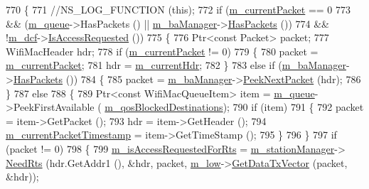 \begin{DoxyCode}
770 \{
771   \textcolor{comment}{//NS\_LOG\_FUNCTION (this);}
772   \textcolor{keywordflow}{if} (\hyperlink{classns3_1_1DcaTxop_a3c454c21337aac0944f86caad8b7a719}{m\_currentPacket} == 0
773       && (\hyperlink{classns3_1_1DcaTxop_a7f42500857237f6f18aee436ef22ef62}{m\_queue}->HasPackets () || \hyperlink{classns3_1_1EdcaTxopN_a7a79eaafe03995bb274451aa752b83b2}{m\_baManager}->\hyperlink{classns3_1_1BlockAckManager_aa4d33e4f453efea9967dc2ebb7142210}{HasPackets} ())
774       && !\hyperlink{classns3_1_1DcaTxop_a16cc1f168ff78aabcf938e42996121c4}{m\_dcf}->\hyperlink{classns3_1_1DcfState_a1a9959645698b0f3d65902b0e382cfa2}{IsAccessRequested} ())
775     \{
776       Ptr<const Packet> packet;
777       WifiMacHeader hdr;
778       \textcolor{keywordflow}{if} (\hyperlink{classns3_1_1DcaTxop_a3c454c21337aac0944f86caad8b7a719}{m\_currentPacket} != 0)
779         \{
780           packet = \hyperlink{classns3_1_1DcaTxop_a3c454c21337aac0944f86caad8b7a719}{m\_currentPacket};
781           hdr = \hyperlink{classns3_1_1DcaTxop_ae965eb2f4d504e00526e751cd1dab3a6}{m\_currentHdr};
782         \}
783       \textcolor{keywordflow}{else} \textcolor{keywordflow}{if} (\hyperlink{classns3_1_1EdcaTxopN_a7a79eaafe03995bb274451aa752b83b2}{m\_baManager}->\hyperlink{classns3_1_1BlockAckManager_aa4d33e4f453efea9967dc2ebb7142210}{HasPackets} ())
784         \{
785           packet = \hyperlink{classns3_1_1EdcaTxopN_a7a79eaafe03995bb274451aa752b83b2}{m\_baManager}->\hyperlink{classns3_1_1BlockAckManager_a27160e30a1652c3a2cf4c0fca44f4166}{PeekNextPacket} (hdr);
786         \}
787       \textcolor{keywordflow}{else}
788         \{
789           Ptr<const WifiMacQueueItem> item = \hyperlink{classns3_1_1DcaTxop_a7f42500857237f6f18aee436ef22ef62}{m\_queue}->PeekFirstAvailable (
      \hyperlink{classns3_1_1EdcaTxopN_a11581df9860f137e60b71cefd399e8b8}{m\_qosBlockedDestinations});
790           \textcolor{keywordflow}{if} (item)
791             \{
792               packet = item->GetPacket ();
793               hdr = item->GetHeader ();
794               \hyperlink{classns3_1_1EdcaTxopN_ad93008b9d802a1c1b007744f0d4f1a73}{m\_currentPacketTimestamp} = item->GetTimeStamp ();
795             \}
796         \}
797       \textcolor{keywordflow}{if} (packet != 0)
798         \{
799           \hyperlink{classns3_1_1EdcaTxopN_a2dbb9cad85e4871b031dc1169c88bb08}{m\_isAccessRequestedForRts} = \hyperlink{classns3_1_1DcaTxop_af78d36622900e857d31315038946d8f6}{m\_stationManager}->
      \hyperlink{classns3_1_1WifiRemoteStationManager_a1552c041e2344e355e9a28859054db27}{NeedRts} (hdr.GetAddr1 (), &hdr, packet, \hyperlink{classns3_1_1DcaTxop_a76de11e512290acc37c9863f7ab17758}{m\_low}->\hyperlink{classns3_1_1MacLow_a04bad04eade9ff1de0940b01c5bcf514}{GetDataTxVector} (packet, &hdr));

\end{DoxyCode}
